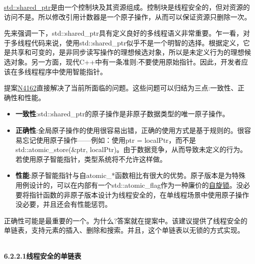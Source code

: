 
\href{https://en.cppreference.com/w/cpp/memory/shared_ptr}{std::shared\_ptr}是由一个控制块及其资源组成。控制块是线程安全的，但对资源的访问不是。所以修改引用计数器是一个原子操作，从而可以保证资源只删除一次。

\begin{tcolorbox}[breakable,enhanced jigsaw,colback=blue!5!white,colframe=blue!75!black,title={线程安全的重要性}]
	
先来强调一下，std::shared\_ptr具有定义良好的多线程语义非常重要。乍一看，对于多线程代码来说，使用std::shared\_ptr似乎不是一个明智的选择。根据定义，它是共享和可变的，是非同步读写操作的理想候选对象，所以是未定义行为的理想候选对象。另一方面，现代C++中有一条准则:不要使用原始指针。因此，开发者应该在多线程程序中使用智能指针。
	
\end{tcolorbox}

提案\href{http://wg21.link/n4162}{N4162}直接解决了当前所面临的问题。这些问题可以归结为三点:一致性、正确性和性能。

\begin{itemize}
\item 
\textbf{一致性}:std::shared\_ptr的原子操作是非原子数据类型的唯一原子操作。

\item 
\textbf{正确性}:全局原子操作的使用很容易出错，正确的使用方式是基于规则的。很容易忘记使用原子操作——例如：使用ptr = localPtr，而不是std::atomic\_store(\&ptr, localPtr)。由于数据竞争，从而导致未定义的行为。若使用原子智能指针，类型系统将不允许这样做。

\item 
\textbf{性能}:原子智能指针与自atomic\_*函数相比有很大的优势。原子版本是为特殊用例设计的，可以在内部有一个std::atomic\_flag作为一种廉价的\href{https://en.wikipedia.org/wiki/Spinlock}{自旋锁}。没必要将指针函数的非原子版本设计为线程安全的，在单线程场景中使用原子操作没必要，并且还会有性能惩罚。
\end{itemize}

正确性可能是最重要的一个。为什么?答案就在提案中。该建议提供了线程安全的单链表，支持元素的插入、删除和搜索。并且，这个单链表以无锁的方式实现。

\hspace*{\fill} \\ %
\noindent
\textbf{6.2.2.1\hspace{0.2cm}线程安全的单链表}

